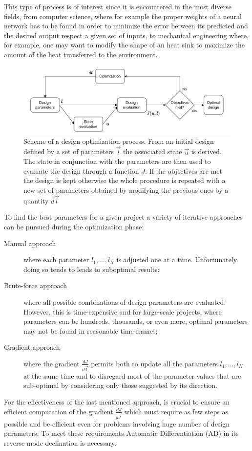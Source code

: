 This type of process is of interest since it is encountered in the most diverse fields, from computer science, where for example the proper weights of a neural network has to be found in order to minimize the error between its predicted and the desired output respect a given set of inputs, to mechanical engineering where, for example, one may want to modify the shape of an heat sink to maximize the amount of the heat transferred to the environment.

\begin{figure}
	\centering
	\includegraphics[width=\textwidth]{img/design_opt_scheme.pdf}
	\caption{Scheme of a design optimization process. From an initial design defined by a set of parameters $\vec{l}$ the associated state $\vec{u}$ is derived. The state in conjunction with the parameters are then used to evaluate the design through a function $J$. If the objectives are met the design is kept otherwise the whole procedure is repeated with a new set of parameters obtained by modifying the previous ones by a quantity $d\vec{l}$} 
	\label{fig:design_opt_scheme}
\end{figure}

To find the best parameters for a given project a variety of iterative approaches can be pursued during the optimization phase:
\begin{description}
	\item[Manual approach] where each parameter $l_1, \dots, l_N$ is adjusted one at a time. Unfortunately doing so tends to leads to suboptimal results;
	\item[Brute-force approach] where all possible combinations of design parameters are evaluated. However, this is time-expensive and for large-scale projects, where parameters can be hundreds, thousands, or even more, optimal parameters may not be found in reasonable time-frames;
	\item[Gradient approach] where the gradient $\frac{dJ}{d\vec{l}}$ permits both to update all the parameters $l_1, \dots, l_N$ at the same time and to disregard most of the parameter values that are sub-optimal by considering only those suggested by its direction.
\end{description}
For the effectiveness of the last mentioned approach, is crucial to ensure an efficient computation of the gradient $\frac{dJ}{d\vec{l}}$ which must require as few steps as possible and be efficient even for problems involving huge number of design parameters. To meet these requirements Automatic Differentiation (AD) in its reverse-mode declination is necessary.

